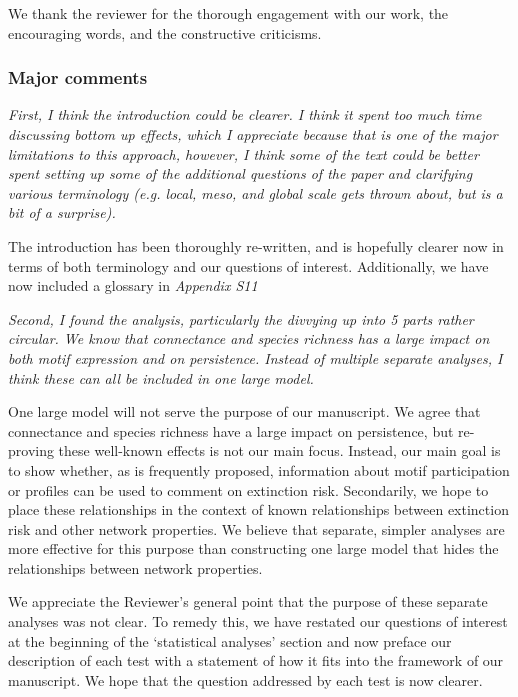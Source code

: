 \documentclass[12pt]{article}
\newcommand{\us}{\rm \setlength{\leftskip}{0.3cm} \setlength{\rightskip}{0.3cm}}
\newcommand{\them}{\it \setlength{\leftskip}{0cm} \setlength{\rightskip}{0cm}}
\begin{document}
    \us
    We thank the reviewer for the thorough engagement with our work, the encouraging words, and the constructive criticisms. 

    \subsubsection*{Major comments}
    
        \them
        First, I think the introduction could be clearer. I think it spent too much time discussing bottom up effects, which I appreciate because that is one of the major limitations to this approach, however, I think some of the text could be better spent setting up some of the additional questions of the paper and clarifying various terminology (e.g. local, meso, and global scale gets thrown about, but is a bit of a surprise).
        
        \us
        The introduction has been thoroughly re-written, and is hopefully clearer now in terms of both terminology and our questions of interest. Additionally, we have now included a glossary in \emph{Appendix S11}
        
        \them
        Second, I found the analysis, particularly the divvying up into 5 parts rather circular. We know that connectance and species richness has a large impact on both motif expression and on persistence. Instead of multiple separate analyses, I think these can all be included in one large model. 
        
        \us One large model will not serve the purpose of our manuscript. We agree that connectance and species richness have a large impact on persistence, but re-proving these well-known effects is not our main focus. Instead, our main goal is to show whether, as is frequently proposed, information about motif participation or profiles can be used to comment on extinction risk. Secondarily, we hope to place these relationships in the context of known relationships between extinction risk and other network properties. We believe that separate, simpler analyses are more effective for this purpose than constructing one large model that hides the relationships between network properties.
        
        We appreciate the Reviewer's general point that the purpose of these separate analyses was not clear. To remedy this, we have restated our questions of interest at the beginning of the `statistical analyses' section and now preface our description of each test with a statement of how it fits into the framework of our manuscript. We hope that the question addressed by each test is now clearer.
        
\end{document}
